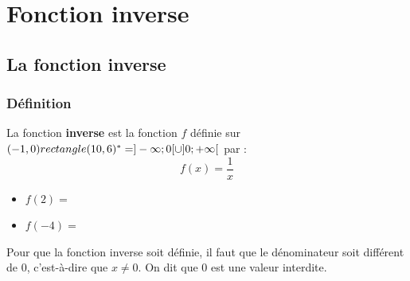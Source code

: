 

\chapter{Fonction inverse}




\section{La fonction inverse}
\subsection{Définition}

\begin{Définition}
La fonction {\bf{inverse}} est la fonction $f$ définie sur $(-1,0) rectangle (10,6)^\ast=]-\infty ; 0 [ \cup ]0 ; +\infty[$ par :
$$f(x)=\frac{1}{x}$$
\end{Définition}


 
\begin{Exemple}
\leavevmode\vspace{-\baselineskip}
\begin{itemize}[label=\textcolor{Couleur8}{$\bullet$}]
\item $f(2)=$ \ligne
\item $f(-4)=$ \ligne
\end{itemize}
\end{Exemple}


\begin{Remarque}
Pour que la fonction inverse soit définie, il faut que le dénominateur soit différent de $0$, c'est-à-dire que $x\neq 0$. On dit que $0$ est une valeur interdite.

\end{Remarque}

\vspace{0.5cm}
